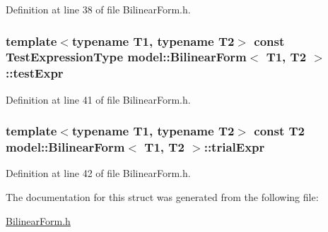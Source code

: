 Definition at line 38 of file Bilinear\+Form.\+h.

\hypertarget{structmodel_1_1_bilinear_form_ae2986c81a6969d33947a1513c4047172}{}
\subsubsection[{test\+Expr}]{\setlength{\rightskip}{0pt plus 5cm}template$<$typename T1, typename T2$>$ const {\bf Test\+Expression\+Type} {\bf model\+::\+Bilinear\+Form}$<$ T1, T2 $>$\+::test\+Expr}\label{structmodel_1_1_bilinear_form_ae2986c81a6969d33947a1513c4047172}


Definition at line 41 of file Bilinear\+Form.\+h.

\hypertarget{structmodel_1_1_bilinear_form_a91346cbd893511a5fe75ef0198e757f1}{}
\subsubsection[{trial\+Expr}]{\setlength{\rightskip}{0pt plus 5cm}template$<$typename T1, typename T2$>$ const T2 {\bf model\+::\+Bilinear\+Form}$<$ T1, T2 $>$\+::trial\+Expr}\label{structmodel_1_1_bilinear_form_a91346cbd893511a5fe75ef0198e757f1}


Definition at line 42 of file Bilinear\+Form.\+h.



The documentation for this struct was generated from the following file\+:\begin{DoxyCompactItemize}
\item 
\hyperlink{_bilinear_form_8h}{Bilinear\+Form.\+h}\end{DoxyCompactItemize}
